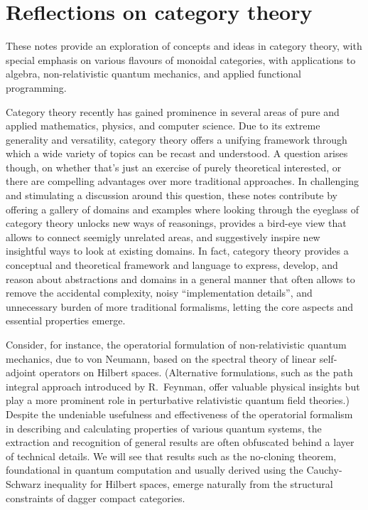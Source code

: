 \chapter*{Reflections on category theory}


These notes provide an exploration of concepts and ideas in category theory, with special emphasis on various flavours of monoidal categories, with applications to algebra, non-relativistic quantum mechanics, and applied functional programming. 

Category theory recently has gained prominence in several areas of pure and applied mathematics, physics, and computer science. 
Due to its extreme generality and versatility, category theory offers a unifying framework through which a wide variety of topics can be recast and understood.  
A question arises though, on whether that's just an exercise of purely theoretical interested, or there are compelling advantages over more traditional approaches. 
In challenging and stimulating a discussion around this question, 
these notes contribute by offering a gallery of domains and examples where looking through the eyeglass of category theory unlocks new ways of reasonings, provides a bird-eye view that allows to connect seemigly unrelated areas, and suggestively inspire new insightful ways to look at existing domains. 
In fact, category theory provides a conceptual and theoretical framework and language to express, develop, and reason about abstractions and domains in a general manner that often allows to remove the accidental complexity, noisy ``implementation details'', and unnecessary burden of more traditional formalisms, letting the core aspects and essential properties emerge. 

Consider, for instance, the operatorial formulation of non-relativistic quantum mechanics, due to von Neumann, based on the spectral theory of linear self-adjoint operators on Hilbert spaces. (Alternative formulations, such as the path integral approach introduced by R.~Feynman, offer valuable physical insights but play a more prominent role in perturbative relativistic quantum field theories.) Despite the undeniable usefulness and effectiveness of the operatorial formalism in describing and calculating properties of various quantum systems, the extraction and recognition of general results are often obfuscated behind a layer of technical details. We will see that results such as the no-cloning theorem, foundational in quantum computation and usually derived using the Cauchy-Schwarz inequality for Hilbert spaces, emerge naturally from the structural constraints of dagger compact categories.

